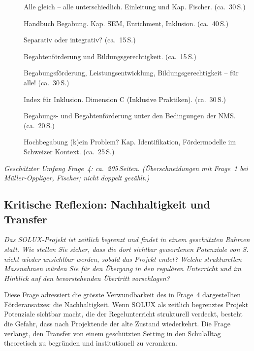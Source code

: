 \documentclass[ngerman, a4paper]{article}
\begin{document}
\begin{description}
  \item[\cite{buholzer2010allegleich}] Alle gleich -- alle unterschiedlich. Einleitung und Kap. Fischer. (ca.~30\,S.)
  \item[\cite{muelleroppliger2021handbuch}] Handbuch Begabung. Kap. SEM, Enrichment, Inklusion. (ca.~40\,S.)
  \item[\cite{weigand2021separativ}] Separativ oder integrativ? (ca.~15\,S.)
  \item[\cite{sedmak2021bildungsgerechtigkeit}] Begabtenförderung und Bildungsgerechtigkeit. (ca.~15\,S.)
  \item[\cite{fischer2020begabungsfoerderung}] Begabungsförderung, Leistungsentwicklung, Bildungsgerechtigkeit -- für alle! (ca.~30\,S.)
  \item[\cite{booth2019index}] Index für Inklusion. Dimension C (Inklusive Praktiken). (ca.~30\,S.)
  \item[\cite{unger2010begabungsfoerderung}] Begabungs- und Begabtenförderung unter den Bedingungen der NMS. (ca.~20\,S.)
  \item[\cite{brunner2021hochbegabung}] Hochbegabung (k)ein Problem?
    Kap. Identifikation, Fördermodelle im Schweizer Kontext. (ca.~25\,S.)
\end{description}
 
\textit{Geschätzter Umfang Frage~4: ca.~205\,Seiten.
(Überschneidungen mit Frage~1 bei Müller-Oppliger, Fischer; nicht doppelt gezählt.)}
 

 


\subsection{Kritische Reflexion: Nachhaltigkeit und Transfer}


\begin{tcolorbox}[colback=gray!5, colframe=gray!50, title=Weiterführende Diskurslinie]
\itshape
Das SOLUX-Projekt ist zeitlich begrenzt und findet in einem geschützten Rahmen statt.
Wie stellen Sie sicher, dass die dort sichtbar gewordenen Potenziale von S. nicht
wieder unsichtbar werden, sobald das Projekt endet? Welche strukturellen Massnahmen
würden Sie für den Übergang in den regulären Unterricht und im Hinblick auf den
bevorstehenden Übertritt vorschlagen?
\end{tcolorbox}

Diese Frage adressiert die grösste Verwundbarkeit des in Frage~4 dargestellten
Förderansatzes: die Nachhaltigkeit. Wenn SOLUX als zeitlich begrenztes Projekt
Potenziale sichtbar macht, die der Regelunterricht strukturell verdeckt, besteht die
Gefahr, dass nach Projektende der alte Zustand wiederkehrt. Die Frage verlangt,
den Transfer von einem geschützten Setting in den Schulalltag theoretisch zu begründen
und institutionell zu verankern.
\end{document}
